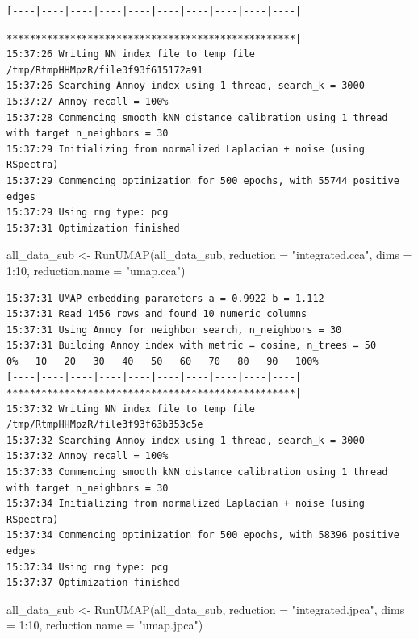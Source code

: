 \documentclass[
  letterpaper,
  DIV=11,
  numbers=noendperiod]{scrreprt}
\newenvironment{Shaded}{\begin{snugshade}}{\end{snugshade}}
\newcommand{\AttributeTok}[1]{\textcolor[rgb]{0.40,0.45,0.13}{#1}}
\newcommand{\DecValTok}[1]{\textcolor[rgb]{0.68,0.00,0.00}{#1}}
\newcommand{\FunctionTok}[1]{\textcolor[rgb]{0.28,0.35,0.67}{#1}}
\newcommand{\NormalTok}[1]{\textcolor[rgb]{0.00,0.23,0.31}{#1}}
\newcommand{\OtherTok}[1]{\textcolor[rgb]{0.00,0.23,0.31}{#1}}
\newcommand{\SpecialCharTok}[1]{\textcolor[rgb]{0.37,0.37,0.37}{#1}}
\newcommand{\StringTok}[1]{\textcolor[rgb]{0.13,0.47,0.30}{#1}}
\begin{document}
\begin{verbatim}
[----|----|----|----|----|----|----|----|----|----|
\end{verbatim}

\begin{verbatim}
**************************************************|
15:37:26 Writing NN index file to temp file /tmp/RtmpHHMpzR/file3f93f615172a91
15:37:26 Searching Annoy index using 1 thread, search_k = 3000
15:37:27 Annoy recall = 100%
15:37:28 Commencing smooth kNN distance calibration using 1 thread with target n_neighbors = 30
15:37:29 Initializing from normalized Laplacian + noise (using RSpectra)
15:37:29 Commencing optimization for 500 epochs, with 55744 positive edges
15:37:29 Using rng type: pcg
15:37:31 Optimization finished
\end{verbatim}

\begin{Shaded}
\begin{Highlighting}[]
\NormalTok{all\_data\_sub }\OtherTok{\textless{}{-}} \FunctionTok{RunUMAP}\NormalTok{(all\_data\_sub, }\AttributeTok{reduction =} \StringTok{"integrated.cca"}\NormalTok{, }\AttributeTok{dims =} \DecValTok{1}\SpecialCharTok{:}\DecValTok{10}\NormalTok{, }\AttributeTok{reduction.name =} \StringTok{"umap.cca"}\NormalTok{)}
\end{Highlighting}
\end{Shaded}

\begin{verbatim}
15:37:31 UMAP embedding parameters a = 0.9922 b = 1.112
15:37:31 Read 1456 rows and found 10 numeric columns
15:37:31 Using Annoy for neighbor search, n_neighbors = 30
15:37:31 Building Annoy index with metric = cosine, n_trees = 50
0%   10   20   30   40   50   60   70   80   90   100%
[----|----|----|----|----|----|----|----|----|----|
**************************************************|
15:37:32 Writing NN index file to temp file /tmp/RtmpHHMpzR/file3f93f63b353c5e
15:37:32 Searching Annoy index using 1 thread, search_k = 3000
15:37:32 Annoy recall = 100%
15:37:33 Commencing smooth kNN distance calibration using 1 thread with target n_neighbors = 30
15:37:34 Initializing from normalized Laplacian + noise (using RSpectra)
15:37:34 Commencing optimization for 500 epochs, with 58396 positive edges
15:37:34 Using rng type: pcg
15:37:37 Optimization finished
\end{verbatim}

\begin{Shaded}
\begin{Highlighting}[]
\NormalTok{all\_data\_sub }\OtherTok{\textless{}{-}} \FunctionTok{RunUMAP}\NormalTok{(all\_data\_sub, }\AttributeTok{reduction =} \StringTok{"integrated.jpca"}\NormalTok{, }\AttributeTok{dims =} \DecValTok{1}\SpecialCharTok{:}\DecValTok{10}\NormalTok{, }\AttributeTok{reduction.name =} \StringTok{"umap.jpca"}\NormalTok{)}
\end{Highlighting}
\end{Shaded}
\end{document}

